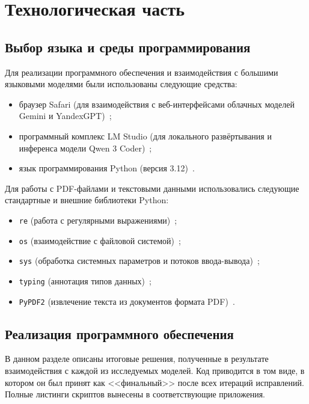 \chapter{Технологическая часть}

\section{Выбор языка и среды программирования}

Для реализации программного обеспечения и взаимодействия с большими языковыми моделями были использованы следующие средства:
\begin{itemize}
    \item браузер Safari (для взаимодействия с веб-интерфейсами облачных моделей Gemini и YandexGPT)~\cite{safari};
    \item программный комплекс LM Studio (для локального развёртывания и инференса модели Qwen 3 Coder)~\cite{lm_studio};
    \item язык программирования Python (версия 3.12)~\cite{python_3_12}.
\end{itemize}

Для работы с PDF-файлами и текстовыми данными использовались следующие стандартные и внешние библиотеки Python:
\begin{itemize}
    \item \texttt{re} (работа с регулярными выражениями)~\cite{python_re};
    \item \texttt{os} (взаимодействие с файловой системой)~\cite{python_os};
    \item \texttt{sys} (обработка системных параметров и потоков ввода-вывода)~\cite{python_sys};
    \item \texttt{typing} (аннотация типов данных)~\cite{python_typing};
    \item \texttt{PyPDF2} (извлечение текста из документов формата PDF)~\cite{pypdf2_docs}.
\end{itemize}

\section{Реализация программного обеспечения}

В данном разделе описаны итоговые решения, полученные в результате взаимодействия с каждой из исследуемых моделей. Код приводится в том виде, в котором он был принят как <<финальный>> после всех итераций исправлений. Полные листинги скриптов вынесены в соответствующие приложения.

